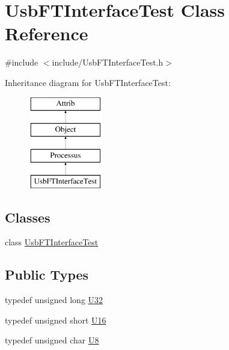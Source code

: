 \hypertarget{classUsbFTInterfaceTest}{}\section{Usb\+F\+T\+Interface\+Test Class Reference}
\label{classUsbFTInterfaceTest}


{\ttfamily \#include $<$include/\+Usb\+F\+T\+Interface\+Test.\+h$>$}

Inheritance diagram for Usb\+F\+T\+Interface\+Test\+:\begin{figure}[H]
\begin{center}
\leavevmode
\includegraphics[height=4.000000cm]{classUsbFTInterfaceTest}
\end{center}
\end{figure}
\subsection*{Classes}
\begin{DoxyCompactItemize}
\item 
class \hyperlink{classUsbFTInterfaceTest_1_1UsbFTInterfaceTest}{Usb\+F\+T\+Interface\+Test}
\end{DoxyCompactItemize}
\subsection*{Public Types}
\begin{DoxyCompactItemize}
\item 
typedef unsigned long \hyperlink{classUsbFTInterfaceTest_a7e1ea68fb6c72d6c994cc0699b0780a3}{U32}
\item 
typedef unsigned short \hyperlink{classUsbFTInterfaceTest_ab034b25c13b6c84815e5858d292d7635}{U16}
\item 
typedef unsigned char \hyperlink{classUsbFTInterfaceTest_ac12634d25ee35ceb35c76ec3a4c5c47f}{U8}
\end{DoxyCompactItemize}
